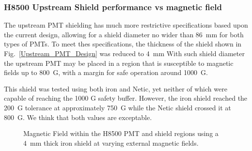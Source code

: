 \documentclass[12pt]{article}
\begin{document}
\subsubsection{H8500 Upstream Shield performance  vs magnetic field}
%
The upstream PMT shielding has much more restrictive specifications based 
upon the current design,
allowing for a shield diameter no wider than 86~mm for both types of PMTs.
  To meet thes specifications, the thickness of the shield 
shown in Fig.~\ref{Upstream_PMT_Design} was reduced to 4~mm
With such shield diameter the upstream PMT may be placed in a region that 
is susceptible to magnetic fields up to 800~G, with a margin for safe 
operation around 1000~G. 

This shield was tested using both iron and Netic, 
yet neither of which were capable of reaching the 1000 G safety buffer. 
However, the iron shield reached the 200~G tolerance at approximately 
750~G while the Netic shield crossed it at 800~G. We think that  both values are exceptable.
%
\begin{figure}[ht]
\centering
{}
\qquad
{}
\caption{\small{Magnetic Field within the H8500 PMT and shield regions using a 4~mm thick iron shield at varying external magnetic fields.}}\label{Upstream_Iron_4mm}
\end{figure}
\end{document}
